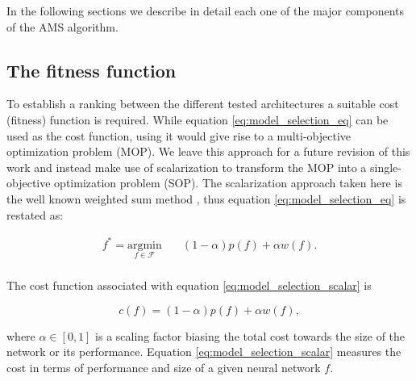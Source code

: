 \documentclass[journal]{IEEEtran}
\begin{document}
In the following sections we describe in detail each one of the major components of the AMS algorithm.


\subsection{The fitness function}
\label{sec:fitness_function}

To establish a ranking between the different tested architectures a suitable cost (fitness) function is required. While equation \ref{eq:model_selection_eq} can be used as the cost function, using it would give rise to a multi-objective optimization problem (MOP). We leave this approach for a future revision of this work and instead make use of scalarization to transform the MOP into a single- objective optimization problem (SOP). The scalarization approach taken here is the well known weighted sum method \cite{Hillermeier2001}, thus equation \ref{eq:model_selection_eq} is restated as: 

\begin{equation}
\begin{aligned}
	f^* = \underset{f \in \mathcal{F}}{\text{argmin}}
	& \quad (1-\alpha)p(f) + \alpha w(f).\\
\end{aligned}
\label{eq:model_selection_scalar}
\end{equation}

The cost function associated with equation \ref{eq:model_selection_scalar} is

\begin{equation}
c(f) = (1-\alpha)p(f) + \alpha w(f), 
\label{eq:fitness_function_scalar}
\end{equation}

where $\alpha \in \left[0,1\right]$ is a scaling factor biasing the total cost towards the size of the network or its performance. Equation \ref{eq:model_selection_scalar} measures the cost in terms of performance and size of a given neural network $f$.

\end{document}
